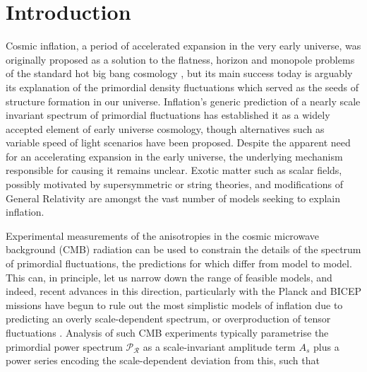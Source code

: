 \documentclass[universe,preprints,oneauthor,pdftex,10pt,a4paper]{mdpi}
\begin{document}


\section{Introduction} \label{sec:intro}

Cosmic inflation, a period of accelerated expansion in the very early universe, was originally proposed as a solution to the flatness, horizon and monopole problems of the standard hot big bang cosmology \cite{Guth:1980zm,Linde:1981mu}, but its main success today is arguably its explanation of the primordial density fluctuations which served as the seeds of structure formation in our universe. Inflation's generic prediction of a nearly scale invariant spectrum of primordial fluctuations has established it as a widely accepted element of early universe cosmology, though alternatives such as variable speed of light scenarios have been proposed. Despite the apparent need for an accelerating expansion in the early universe, the underlying mechanism responsible for causing it remains unclear. Exotic matter such as scalar fields, possibly motivated by supersymmetric or string theories, and modifications of General Relativity are amongst the vast number of models \cite{Escudero:2015wba,Martin:2013tda} seeking to explain inflation.

Experimental measurements of the anisotropies in the cosmic microwave background (CMB) radiation can be used to constrain the details of the spectrum of primordial fluctuations, the predictions for which differ from model to model. This can, in principle, let us narrow down the range of feasible models, and indeed, recent advances in this direction, particularly with the Planck and BICEP missions have begun to rule out the most simplistic models of inflation due to predicting an overly scale-dependent spectrum, or overproduction of tensor fluctuations \cite{Ade:2015lrj,Ade:2015tva}. Analysis of such CMB experiments typically parametrise the primordial power spectrum $\mathcal{P}_\mathcal{R}$ as a scale-invariant amplitude term $A_s$ plus a power series encoding the scale-dependent deviation from this, such that
\end{document}
